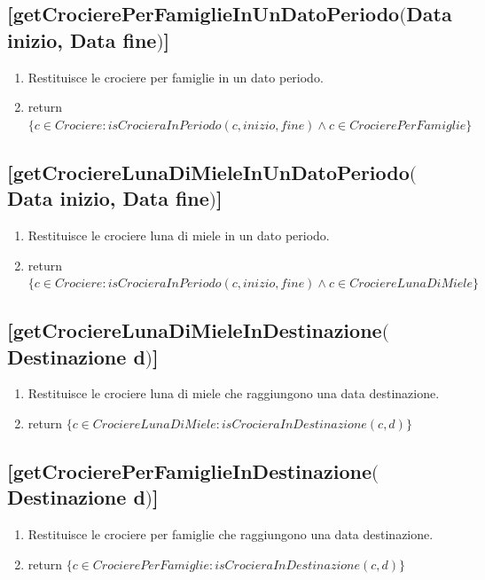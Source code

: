 \documentclass{article}
\begin{document}
\subsection*{[getCrocierePerFamiglieInUnDatoPeriodo$($Data inizio, Data fine$)$]}
\begin{enumerate}
    \item Restituisce le crociere per famiglie in un dato periodo.
    \item return $\{c \in Crociere: isCrocieraInPeriodo(c, inizio, fine) \land c \in CrocierePerFamiglie\}$
\end{enumerate}

\subsection*{[getCrociereLunaDiMieleInUnDatoPeriodo$($Data inizio, Data fine$)$]}
\begin{enumerate}
    \item Restituisce le crociere luna di miele in un dato periodo.
    \item return $\{c \in Crociere: isCrocieraInPeriodo(c, inizio, fine) \land c \in CrociereLunaDiMiele\}$
\end{enumerate}

\subsection*{[getCrociereLunaDiMieleInDestinazione$($Destinazione d$)$]}
\begin{enumerate}
    \item Restituisce le crociere luna di miele che raggiungono una data destinazione.
    \item return $\{c \in CrociereLunaDiMiele: isCrocieraInDestinazione(c, d)\}$
\end{enumerate}

\subsection*{[getCrocierePerFamiglieInDestinazione$($Destinazione d$)$]}
\begin{enumerate}
    \item Restituisce le crociere per famiglie che raggiungono una data destinazione.
    \item return $\{c \in CrocierePerFamiglie: isCrocieraInDestinazione(c, d)\}$
\end{enumerate}
\end{document}
